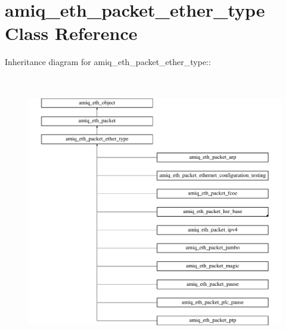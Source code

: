 \hypertarget{classamiq__eth__packet__ether__type}{
\section{amiq\_\-eth\_\-packet\_\-ether\_\-type Class Reference}
\label{classamiq__eth__packet__ether__type}
}
Inheritance diagram for amiq\_\-eth\_\-packet\_\-ether\_\-type::\begin{figure}[H]
\begin{center}
\leavevmode
\includegraphics[height=12cm]{classamiq__eth__packet__ether__type}
\end{center}
\end{figure}
